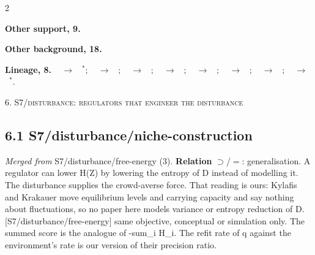 \documentclass[10pt]{article}
\newcommand{\memb}[1]{\par\smallskip\textbf{#1}\quad}
\begin{document}
\begin{multicols}{2}
\memb{Other support, 9.} \citetext{\citealp{MacArthur-limiting67}; \citealp{Fretwell-territorial69}; \citealp{Geritz-evolutionarily98}; \citealp{Chesson-mechanisms00}; \citealp{Abrams-coexistence09}; \citealp{Theraulaz-response98}; \citealp{Suarez-neural19}; \citealp{Wang-roma20}; \citealp{Amir-when26}}

\memb{Other background, 18.} {\footnotesize \citetext{\citealp{Gause-experimental34}\dag; \citealp{Hutchinson-concluding57}\dag; \citealp{Hardin-competitive60}; \citealp{Levin-community70}; \citealp{May-niche72}; \citealp{Armstrong-competitive80}; \citealp{Tilman-resource82}\dag; \citealp{Dieckmann-origin99}; \citealp{Lehman-evolving11}; \citealp{Bonabeau-role99}; \citealp{Cigler-decentralized14}; \citealp{Ferrante-evolution15}; \citealp{Perolat-multi17}; \citealp{Jiang-emergence20}; \citealp{Li-celebrating21}; \citealp{Wang-rode21}; \citealp{Bettini-system23}; \citealp{Bettini-controlling24}}}

\end{multicols}
\memb{Lineage, 8.} {\footnotesize \citeauthor{Gause-experimental34}~\citeyear{Gause-experimental34} $\to$ \citeauthor{Hardin-competitive60}~\citeyear{Hardin-competitive60}$^\ast$; \citeauthor{Hutchinson-concluding57}~\citeyear{Hutchinson-concluding57} $\to$ \citeauthor{Abrams-coexistence09}~\citeyear{Abrams-coexistence09}; \citeauthor{MacArthur-limiting67}~\citeyear{MacArthur-limiting67} $\to$ \citeauthor{Abrams-coexistence09}~\citeyear{Abrams-coexistence09}; \citeauthor{Levin-community70}~\citeyear{Levin-community70} $\to$ \citeauthor{Abrams-coexistence09}~\citeyear{Abrams-coexistence09}; \citeauthor{May-niche72}~\citeyear{May-niche72} $\to$ \citeauthor{Abrams-coexistence09}~\citeyear{Abrams-coexistence09}; \citeauthor{Armstrong-competitive80}~\citeyear{Armstrong-competitive80} $\to$ \citeauthor{Abrams-coexistence09}~\citeyear{Abrams-coexistence09}; \citeauthor{Geritz-evolutionarily98}~\citeyear{Geritz-evolutionarily98} $\to$ \citeauthor{Dieckmann-origin99}~\citeyear{Dieckmann-origin99}; \citeauthor{Chesson-mechanisms00}~\citeyear{Chesson-mechanisms00} $\to$ \citeauthor{Abrams-coexistence09}~\citeyear{Abrams-coexistence09}$^\ast$.}

\medskip\textsc{6. S7/disturbance: regulators that engineer the disturbance}

\subsection{6.1 S7/disturbance/niche-construction}\label{node:S7-S7-disturbance-niche-construction}
\textit{Merged from} S7/disturbance/free-energy (3). \textbf{Relation} $\supset$/$=$: generalisation. A regulator can lower H(Z) by lowering the entropy of D instead of modelling it. The disturbance supplies the crowd-averse force. That reading is ours: Kylafis and Krakauer move equilibrium levels and carrying capacity and say nothing about fluctuations, so no paper here models variance or entropy reduction of D. [S7/disturbance/free-energy] same objective, conceptual or simulation only. The summed score is the analogue of -sum\_i H\_i. The refit rate of q against the environment's rate is our version of their precision ratio.
\end{document}
